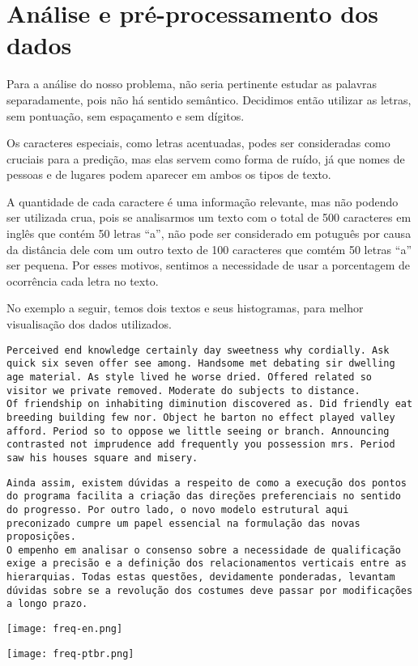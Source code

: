 \section{Análise e pré-processamento dos dados}
Para a análise do nosso problema, não seria pertinente estudar as palavras separadamente, pois não há sentido semântico. Decidimos então utilizar as letras, sem pontuação, sem espaçamento e sem dígitos.

Os caracteres especiais, como letras acentuadas, podes ser consideradas como cruciais para a predição, mas elas servem como forma de ruído, já que nomes de pessoas e de lugares podem aparecer em ambos os tipos de texto.

A quantidade de cada caractere é uma informação relevante, mas não podendo ser utilizada crua, pois se analisarmos um texto com o total de 500 caracteres em inglês que contém 50 letras “a”, não pode ser considerado em potuguês por causa da distância dele com um outro texto de 100 caracteres que comtém 50 letras “a” ser pequena. Por esses motivos, sentimos a necessidade de usar a porcentagem de ocorrência cada letra no texto.

No exemplo a seguir, temos dois textos e seus histogramas, para melhor visualisação dos dados utilizados.

\begin{framed}
    \texttt{Perceived end knowledge certainly day sweetness why cordially. Ask quick six seven offer see among. Handsome met debating sir dwelling age material. As style lived he worse dried. Offered related so visitor we private removed. Moderate do subjects to distance.\\Of friendship on inhabiting diminution discovered as. Did friendly eat breeding building few nor. Object he barton no effect played valley afford. Period so to oppose we little seeing or branch. Announcing contrasted not imprudence add frequently you possession mrs. Period saw his houses square and misery.}
\end{framed}

\begin{framed}
    \texttt{Ainda assim, existem dúvidas a respeito de como a execução dos pontos do programa facilita a criação das direções preferenciais no sentido do progresso. Por outro lado, o novo modelo estrutural aqui preconizado cumpre um papel essencial na formulação das novas proposições.\\O empenho em analisar o consenso sobre a necessidade de qualificação exige a precisão e a definição dos relacionamentos verticais entre as hierarquias. Todas estas questões, devidamente ponderadas, levantam dúvidas sobre se a revolução dos costumes deve passar por modificações a longo prazo.}
\end{framed}

\begin{center}
    \texttt{[image: freq-en.png]}
\end{center}

\begin{center}
    \texttt{[image: freq-ptbr.png]}
\end{center}

